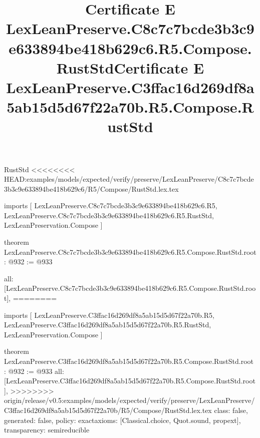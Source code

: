 \begin{lexlean}{RustStd}
<<<<<<<< HEAD:examples/models/expected/verify/preserve/LexLeanPreserve/C8c7c7bcde3b3c9e633894be418b629c6/R5/Compose/RustStd.lex.tex
\title{Certificate E LexLeanPreserve.C8c7c7bcde3b3c9e633894be418b629c6.R5.Compose.RustStd}
\begin{coremodule}
imports [
  LexLeanPreserve.C8c7c7bcde3b3c9e633894be418b629c6.R5,
  LexLeanPreserve.C8c7c7bcde3b3c9e633894be418b629c6.R5.RustStd,
  LexLeanPreservation.Compose
]

theorem LexLeanPreserve.C8c7c7bcde3b3c9e633894be418b629c6.R5.Compose.RustStd.root : @932 := @933 {
  all: [LexLeanPreserve.C8c7c7bcde3b3c9e633894be418b629c6.R5.Compose.RustStd.root],
========
\title{Certificate E LexLeanPreserve.C3ffac16d269df8a5ab15d5d67f22a70b.R5.Compose.RustStd}
\begin{coremodule}
imports [
  LexLeanPreserve.C3ffac16d269df8a5ab15d5d67f22a70b.R5,
  LexLeanPreserve.C3ffac16d269df8a5ab15d5d67f22a70b.R5.RustStd,
  LexLeanPreservation.Compose
]

theorem LexLeanPreserve.C3ffac16d269df8a5ab15d5d67f22a70b.R5.Compose.RustStd.root : @932 := @933 {
  all: [LexLeanPreserve.C3ffac16d269df8a5ab15d5d67f22a70b.R5.Compose.RustStd.root],
>>>>>>>> origin/release/v0.5:examples/models/expected/verify/preserve/LexLeanPreserve/C3ffac16d269df8a5ab15d5d67f22a70b/R5/Compose/RustStd.lex.tex
  class: false,
  generated: false,
  policy: exact{axioms: [Classical.choice, Quot.sound, propext]},
  transparency: semireducible
}


\end{coremodule}}
\end{coremodule}
\end{lexlean}
